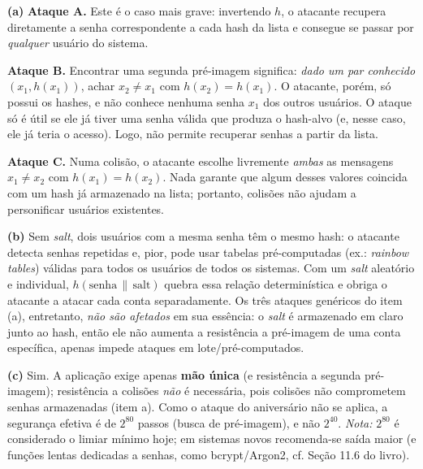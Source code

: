 \documentclass[11pt,a4paper]{article}
\newenvironment{resposta}{%
    \begin{respostabox}
    \color{red!70!black}\sloppy
}{%
    \end{respostabox}
}
\begin{document}
\begin{resposta}
\textbf{(a)}
\textbf{Ataque A.} Este \'{e} o caso mais grave: invertendo $h$, o atacante recupera diretamente a senha correspondente a cada hash da lista e consegue se passar por \emph{qualquer} usu\'{a}rio do sistema.

\textbf{Ataque B.} Encontrar uma segunda pr\'{e}-imagem significa: \emph{dado um par conhecido} $(x_1, h(x_1))$, achar $x_2 \neq x_1$ com $h(x_2) = h(x_1)$. O atacante, por\'{e}m, s\'{o} possui os hashes, e n\~{a}o conhece nenhuma senha $x_1$ dos outros usu\'{a}rios. O ataque s\'{o} \'{e} \'{u}til se ele j\'{a} tiver uma senha v\'{a}lida que produza o hash-alvo (e, nesse caso, ele j\'{a} teria o acesso). Logo, n\~{a}o permite recuperar senhas a partir da lista.

\textbf{Ataque C.} Numa colis\~{a}o, o atacante escolhe livremente \emph{ambas} as mensagens $x_1 \neq x_2$ com $h(x_1) = h(x_2)$. Nada garante que algum desses valores coincida com um hash j\'{a} armazenado na lista; portanto, colis\~{o}es n\~{a}o ajudam a personificar usu\'{a}rios existentes.

\textbf{(b)} Sem \textit{salt}, dois usu\'{a}rios com a mesma senha t\^{e}m o mesmo hash: o atacante detecta senhas repetidas e, pior, pode usar tabelas pr\'{e}-computadas (ex.: \textit{rainbow tables}) v\'{a}lidas para todos os usu\'{a}rios de todos os sistemas. Com um \textit{salt} aleat\'{o}rio e individual, $h(\text{senha} \,\|\, \text{salt})$ quebra essa rela\c{c}\~{a}o determin\'{i}stica e obriga o atacante a atacar cada conta separadamente. Os tr\^{e}s ataques gen\'{e}ricos do item (a), entretanto, \emph{n\~{a}o s\~{a}o afetados} em sua ess\^{e}ncia: o \textit{salt} \'{e} armazenado em claro junto ao hash, ent\~{a}o ele n\~{a}o aumenta a resist\^{e}ncia a pr\'{e}-imagem de uma conta espec\'{i}fica, apenas impede ataques em lote/pr\'{e}-computados.

\textbf{(c)} Sim. A aplica\c{c}\~{a}o exige apenas \textbf{m\~{a}o \'{u}nica} (e resist\^{e}ncia a segunda pr\'{e}-imagem); resist\^{e}ncia a colis\~{o}es \emph{n\~{a}o} \'{e} necess\'{a}ria, pois colis\~{o}es n\~{a}o comprometem senhas armazenadas (item a). Como o ataque do anivers\'{a}rio n\~{a}o se aplica, a seguran\c{c}a efetiva \'{e} de $2^{80}$ passos (busca de pr\'{e}-imagem), e n\~{a}o $2^{40}$. \textit{Nota:} $2^{80}$ \'{e} considerado o limiar m\'{i}nimo hoje; em sistemas novos recomenda-se sa\'{i}da maior (e fun\c{c}\~{o}es lentas dedicadas a senhas, como bcrypt/Argon2, cf. Se\c{c}\~{a}o 11.6 do livro).
\end{resposta}
\end{document}
